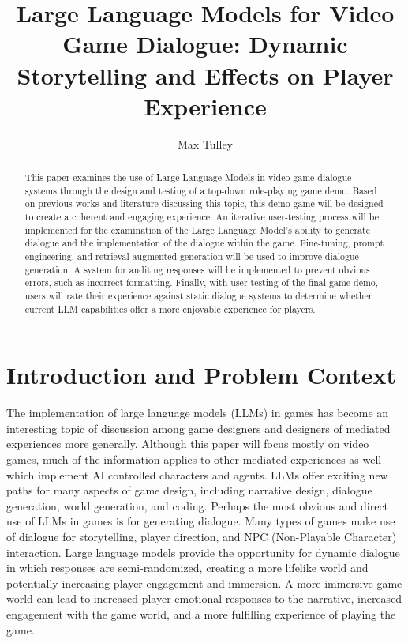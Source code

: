 \documentclass[10pt,twocolumn]{article}
\title{Large Language Models for Video Game Dialogue: Dynamic Storytelling and Effects on Player Experience}
\author{Max Tulley}
\affiliation{Occidental College}
\begin{document}
\maketitle




\begin{abstract}

    This paper examines the use of Large Language Models in video game dialogue systems through the design and testing of a top-down role-playing game demo. Based on previous works and literature discussing this topic, this demo game will be designed to create a coherent and engaging experience. An iterative user-testing process will be implemented for the examination of the Large Language Model's ability to generate dialogue and the implementation of the dialogue within the game. Fine-tuning, prompt engineering, and retrieval augmented generation will be used to improve dialogue generation. A system for auditing responses will be implemented to prevent obvious errors, such as incorrect formatting. Finally, with user testing of the final game demo, users will rate their experience against static dialogue systems to determine whether current LLM capabilities offer a more enjoyable experience for players. 
    
\end{abstract}

\section{Introduction and Problem Context}
    
    \par 
    The implementation of large language models (LLMs) in games has become an interesting topic of discussion among game designers and designers of mediated experiences more generally. Although this paper will focus mostly on video games, much of the information applies to other mediated experiences as well which implement AI controlled characters and agents. LLMs offer exciting new paths for many aspects of game design, including narrative design, dialogue generation, world generation, and coding. Perhaps the most obvious and direct use of LLMs in games is for generating dialogue. Many types of games make use of dialogue for storytelling, player direction, and NPC (Non-Playable Character) interaction. Large language models provide the opportunity for dynamic dialogue in which responses are semi-randomized, creating a more lifelike world and potentially increasing player engagement and immersion. A more immersive game world can lead to increased player emotional responses to the narrative, increased engagement with the game world, and a more fulfilling experience of playing the game. 
    
\end{document}
